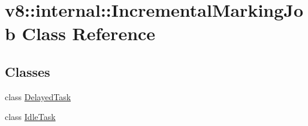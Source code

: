 \hypertarget{classv8_1_1internal_1_1_incremental_marking_job}{}\section{v8\+:\+:internal\+:\+:Incremental\+Marking\+Job Class Reference}
\label{classv8_1_1internal_1_1_incremental_marking_job}
\subsection*{Classes}
\begin{DoxyCompactItemize}
\item 
class \hyperlink{classv8_1_1internal_1_1_incremental_marking_job_1_1_delayed_task}{Delayed\+Task}
\item 
class \hyperlink{classv8_1_1internal_1_1_incremental_marking_job_1_1_idle_task}{Idle\+Task}
\end{DoxyCompactItemize}
